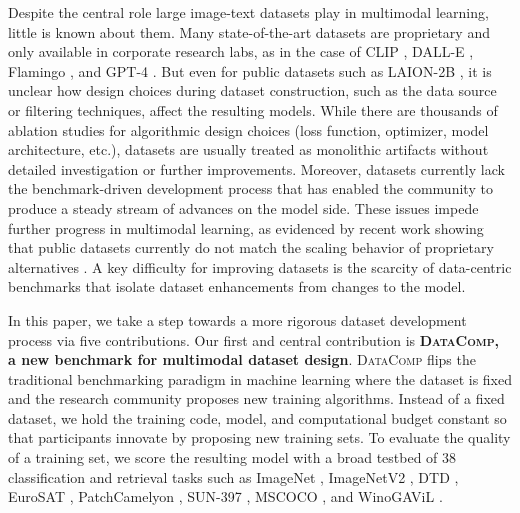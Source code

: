 \documentclass[dvipsnames,11pt]{article}
\newcommand{\datanet}{\textsc{DataComp}\xspace}
\begin{document}
Despite the central role large image-text datasets play in multimodal learning, little is known about them.
Many state-of-the-art datasets are proprietary and only available in corporate research labs, as in the case of CLIP \cite{radford2021learning}, DALL-E \cite{ramesh2021zero,ramesh2022hierarchical}, Flamingo \cite{alayrac2022flamingo}, and GPT-4 \cite{gpt4}.
But even for public datasets such as LAION-2B \cite{laion5b}, it is unclear how design choices during dataset construction, such as the data source or filtering techniques, affect the resulting models.
While there are thousands of ablation studies for algorithmic design choices (loss function, optimizer, model architecture, etc.), datasets are usually treated as monolithic artifacts without detailed investigation or further improvements.
Moreover, datasets currently lack the benchmark-driven development process that has enabled the community to produce a steady stream of advances on the model side.
These issues impede further progress in multimodal learning, as evidenced by recent work showing that public datasets currently do not match the scaling behavior of proprietary alternatives \citep{cherti2022reproducible}.
A key difficulty for improving datasets is the scarcity of data-centric benchmarks that isolate dataset enhancements from changes to the model.

In this paper, we take a step towards a more rigorous dataset development process via five contributions.
Our first and central contribution is \textbf{\datanet, a new benchmark for multimodal dataset design}.
\datanet flips the traditional benchmarking paradigm in machine learning where the dataset is fixed and the research community proposes new training algorithms.
Instead of a fixed dataset, we hold the training code, model, and computational budget constant so that participants innovate by proposing new training sets.
To evaluate the quality of a training set, we score the resulting model with a broad testbed of 38 classification and retrieval tasks such as ImageNet \cite{deng2009imagenet}, ImageNetV2 \cite{imagenetv2}, DTD \cite{dtd}, EuroSAT \cite{eurosat}, PatchCamelyon \cite{patchcamelyon}, SUN-397 \cite{sun397}, MSCOCO \cite{mscoco}, and WinoGAViL \cite{bitton2022winogavil}.
\end{document}
